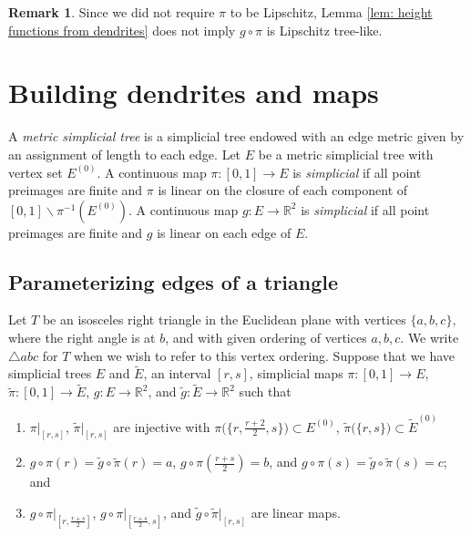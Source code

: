 \documentclass[11pt, leqno]{amsart}
\theoremstyle{definition}\newtheorem{definition}[theorem]{Definition}
\newtheorem{remark}[theorem]{Remark}
\begin{document}
\begin{remark}
    Since we did not require $\pi$ to be Lipschitz, Lemma \ref{lem: height functions from dendrites} does not imply $g\circ \pi$ is Lipschitz tree-like.
\end{remark}





\section{Building dendrites and maps}\label{sectionbuildingdendrites}

A \emph{metric simplicial tree} is a simplicial tree endowed with an edge metric given by an assignment of length to each edge.  Let $E$ be a metric simplicial tree with vertex set $E^{(0)}$. A continuous map $\pi:[0,1]\to E$ is \emph{simplicial} if all point preimages are finite and $\pi$ is linear on the closure of each component of $[0,1]\backslash\pi^{-1}(E^{(0)})$. A continuous map $g: E\to \mathbb R^2$ is \emph{simplicial} if all point preimages are finite and $g$ is linear on each edge of $E$.

\subsection{Parameterizing edges of a triangle}

Let $T$ be an isosceles right triangle in the Euclidean plane with vertices $\big\{a, b, c\big\}$, where the right angle is at $b$, and with given ordering of vertices $a,b,c$.  We write $\triangle abc$ for $T$ when we wish to refer to this vertex ordering. Suppose that we have simplicial trees $E$ and $\tilde E$, an interval $[r,s]$,  simplicial maps $\pi: [0,1]\to E$, $\tilde \pi: [0,1]\to \tilde E$,  $g: E\to \mathbb R^2$, and $\tilde g: \tilde E\to \mathbb R^2$  such that
\begin{enumerate}
    \item\label{ind: vertices} $\pi|_{[r,s]}$, $\tilde \pi|_{[r,s]}$ are injective with $\pi\big(\{r,\tfrac{r+2}{2}, s\}\bigr)\subset E^{(0)}$, $\tilde \pi\big(\{r,s\}\bigr)\subset \tilde E^{(0)}$

    \item $g\circ \pi(r) = \tilde g\circ \tilde \pi(r) =a$, $g\circ \pi(\frac{r+s}{2}) = b$, and  $g\circ \pi(s) = \tilde g\circ \tilde \pi(s) = c$; and
    \item $g\circ \pi|_{[r,\frac{r+s}{2}]}$, $g\circ \pi|_{[\frac{r+s}{2}, s]}$, and $\tilde g\circ \tilde \pi|_{[r,s]}$ are linear maps.

\end{enumerate}
\end{document}
